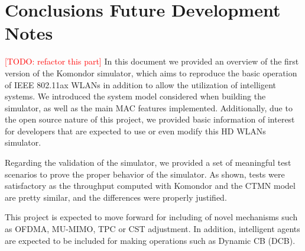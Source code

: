 \documentclass[a4paper]{article}
\begin{document}
\section{Conclusions Future Development Notes}
\label{section:conclusions}
\textcolor{red}{[TODO: refactor this part]}
In this document we provided an overview of the first version of the Komondor simulator, which aims to reproduce the basic operation of IEEE 802.11ax WLANs in addition to allow the utilization of intelligent systems. We introduced the system model considered when building the simulator, as well as the main MAC features implemented. Additionally, due to the open source nature of this project, we provided basic information of interest for developers that are expected to use or even modify this HD WLANs simulator.

Regarding the validation of the simulator, we provided a set of meaningful test scenarios to prove the proper behavior of the simulator. As shown, tests were satisfactory as the throughput computed with Komondor and the CTMN model are pretty similar, and the differences were properly justified.

This project is expected to move forward for including of novel mechanisms such as OFDMA, MU-MIMO, TPC or  CST adjustment. In addition, intelligent agents are expected to be included for making operations such as Dynamic CB (DCB).



\end{document}
